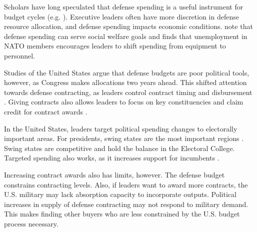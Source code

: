 \documentclass[12pt]{article}
\begin{document}
Scholars have long speculated that defense spending is a useful instrument for budget cycles (e.g. \cite{Tufte1978, Mintz1988}).
Executive leaders often have more discretion in defense resource allocation, and defense spending impacts economic conditions.
\citet{WhittenWilliams2011} note that defense spending can serve social welfare goals and \citet{Becker2021} finds that unemployment in NATO members encourages leaders to shift spending from equipment to personnel.


Studies of the United States argue that defense budgets are poor political tools, however, as Congress makes allocations two years ahead.
This shifted attention towards defense contracting, as leaders control contract timing and disbursement \citep{Mayer1995, DerouenHeo2000}.
Giving contracts also allows leaders to focus on key constituencies and claim credit for contract awards \citep{DerouenHeo2000}. 


In the United States, leaders target political spending changes to electorally important areas.
For presidents, swing states are the most important regions \citep{KrinerReeves2015}.
Swing states are competitive and hold the balance in the Electoral College. 
Targeted spending also works, as it increases support for incumbents \citep{KrinerReeves2012}.




Increasing contract awards also has limits, however. 
The defense budget constrains contracting levels. 
Also, if leaders want to award more contracts, the U.S. military may lack absorption capacity to incorporate outputs.
Political increases in supply of defense contracting may not respond to military demand.
This makes finding other buyers who are less constrained by the U.S. budget process necessary.
\end{document}
